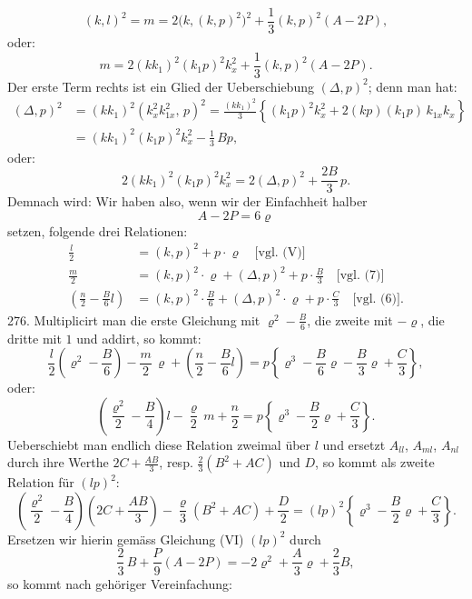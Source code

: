 \[
(k,l)^2 = m = 2\big(k,(k,p)^2\big)^2 + \frac{1}{3}(k,p)^2(A-2P),
\]
oder:
\[
m = 2(kk_1)^2(k_1p)^2 k_x^2 + \frac{1}{3}(k,p)^2(A-2P).
\]
Der erste Term rechts ist ein Glied der Ueberschiebung $(\Delta,p)^2$; denn man hat:
\[
\begin{aligned}
(\Delta,p)^2 &= (kk_1)^2(k_x^2 k_{1x}^2,\,p)^2 = \frac{(kk_1)^2}{3}\left\{ (k_1p)^2 k_x^2 + 2(kp)(k_1p)\,k_{1x} k_x \right\} \\
&= (kk_1)^2(k_1p)^2 k_x^2 - \frac{1}{3}\,Bp,
\end{aligned}
\]
oder:
\[
2(kk_1)^2(k_1p)^2 k_x^2 = 2(\Delta,p)^2 + \frac{2B}{3}\,p.
\]
Demnach wird:
Wir haben also, wenn wir der Einfachheit halber
\[
A - 2P = 6\varrho
\]
setzen, folgende drei Relationen:
\[
\begin{aligned}
\frac{l}{2} &= (k,p)^2 + p\cdot\varrho \quad\text{[vgl.\ (V)]} \\
\frac{m}{2} &= (k,p)^2\cdot\varrho + (\Delta,p)^2 + p\cdot\frac{B}{3} \quad\text{[vgl.\ (7)]} \\
\left(\frac{n}{2}-\frac{B}{6}l\right) &= (k,p)^2\cdot\frac{B}{6} + (\Delta,p)^2\cdot\varrho + p\cdot\frac{C}{3} \quad\text{[vgl.\ (6)].}
\end{aligned}
\]
276. Multiplicirt man die erste Gleichung mit $\varrho^2-\frac{B}{6}$, die zweite mit $-\varrho$, die dritte mit $1$ und addirt, so kommt:
\[
\frac{l}{2}\left(\varrho^2-\frac{B}{6}\right) - \frac{m}{2}\,\varrho + \left(\frac{n}{2}-\frac{B}{6}l\right) = p\left\{ \varrho^3 - \frac{B}{6}\varrho - \frac{B}{3}\varrho + \frac{C}{3} \right\},
\]
oder:
\[
\left(\frac{\varrho^2}{2}-\frac{B}{4}\right) l - \frac{\varrho}{2}\,m + \frac{n}{2} = p\left\{ \varrho^3 - \frac{B}{2}\varrho + \frac{C}{3} \right\}.
\]
Ueberschiebt man endlich diese Relation zweimal über $l$ und ersetzt $A_{ll}$, $A_{ml}$, $A_{nl}$ durch ihre Werthe $2C+\frac{AB}{3}$, resp. $\frac{2}{3}(B^2+AC)$ und $D$, so kommt als zweite Relation für $(lp)^2$:
\[
\left(\frac{\varrho^2}{2}-\frac{B}{4}\right)\left(2C+\frac{AB}{3}\right) - \frac{\varrho}{3}(B^2+AC) + \frac{D}{2} = (lp)^2\left\{ \varrho^3 - \frac{B}{2}\varrho + \frac{C}{3} \right\}.
\]
Ersetzen wir hierin gemäss Gleichung (VI) $(lp)^2$ durch
\[
\frac{2}{3}\,B + \frac{P}{9}(A-2P) = -2\varrho^2 + \frac{A}{3}\varrho + \frac{2}{3}B,
\]
so kommt nach gehöriger Vereinfachung:


